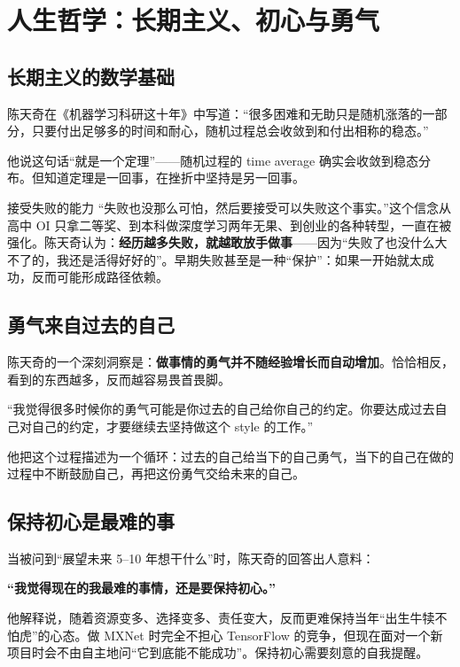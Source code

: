 \section{人生哲学：长期主义、初心与勇气}

\subsection{长期主义的数学基础}

陈天奇在《机器学习科研这十年》中写道：``很多困难和无助只是随机涨落的一部分，只要付出足够多的时间和耐心，随机过程总会收敛到和付出相称的稳态。''

他说这句话``就是一个定理''------随机过程的 time average 确实会收敛到稳态分布。但知道定理是一回事，在挫折中坚持是另一回事。

\begin{importantbox}{接受失败的能力}
``失败也没那么可怕，然后要接受可以失败这个事实。''这个信念从高中 OI 只拿二等奖、到本科做深度学习两年无果、到创业的各种转型，一直在被强化。陈天奇认为：\textbf{经历越多失败，就越敢放手做事}------因为``失败了也没什么大不了的，我还是活得好好的''。早期失败甚至是一种``保护''：如果一开始就太成功，反而可能形成路径依赖。
\end{importantbox}

\subsection{勇气来自过去的自己}

陈天奇的一个深刻洞察是：\textbf{做事情的勇气并不随经验增长而自动增加}。恰恰相反，看到的东西越多，反而越容易畏首畏脚。

``我觉得很多时候你的勇气可能是你过去的自己给你自己的约定。你要达成过去自己对自己的约定，才要继续去坚持做这个 style 的工作。''

他把这个过程描述为一个循环：过去的自己给当下的自己勇气，当下的自己在做的过程中不断鼓励自己，再把这份勇气交给未来的自己。

\subsection{保持初心是最难的事}

当被问到``展望未来 5--10 年想干什么''时，陈天奇的回答出人意料：

\textbf{``我觉得现在的我最难的事情，还是要保持初心。''}

他解释说，随着资源变多、选择变多、责任变大，反而更难保持当年``出生牛犊不怕虎''的心态。做 MXNet 时完全不担心 TensorFlow 的竞争，但现在面对一个新项目时会不由自主地问``它到底能不能成功''。保持初心需要刻意的自我提醒。

